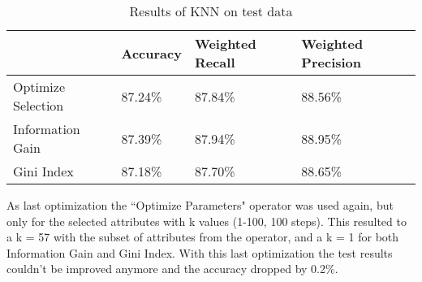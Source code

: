 \begin{table}[H]
\begin{tabular}{@{}llll@{}}
\toprule
                                        & Accuracy & Weighted Recall & Weighted Precision \\ \midrule
\multicolumn{1}{l|}{Optimize Selection} & 87.24\%  & 87.84\%         & 88.56\%            \\
\multicolumn{1}{l|}{Information Gain}          & 87.39\%  & 87.94\%         & 88.95\%            \\
\multicolumn{1}{l|}{Gini Index}         & 87.18\%  & 87.70\%         & 88.65\%            \\ \bottomrule
\end{tabular}
\label{Tab:KNNResults}
\caption{Results of KNN on test data}
\end{table}

As last optimization the ``Optimize Parameters" operator was used again, but only for the selected attributes with k values (1-100, 100 steps). This resulted to a k = 57 with the subset of attributes from the operator, and a k = 1 for both Information Gain and Gini Index. With this last optimization the test results couldn't be improved anymore and the accuracy dropped by 0.2\%.
